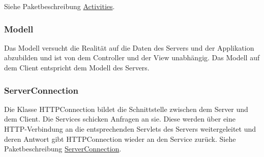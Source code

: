 \begin {center}
\end {center}

Siehe Paketbeschreibung \hyperlink{view}{Activities}.
	
	\subsubsection{Modell}
Das Modell versucht die Realität auf die Daten des Servers und der Applikation abzubilden und ist von dem Controller und der View unabhängig. 
Das Modell auf dem Client entspricht dem Modell des Servers.

	\subsubsection{ServerConnection}
	Die Klasse HTTPConnection bildet die Schnittstelle zwischen dem Server und dem Client. Die Services schicken Anfragen an sie. Diese werden über eine HTTP-Verbindung an die entsprechenden Servlets des Servers weitergeleitet und deren Antwort gibt HTTPConnection wieder an den Service zurück.
\newline
Siehe Paketbeschreibung \hyperlink{controler.serverConnection}{ServerConnection}.

